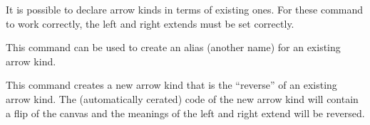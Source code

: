 It is possible to declare arrow kinds in terms of existing ones. For
these command to work correctly, the left and right extends must be
set correctly.

\begin{command}{\pgfarrowsdeclarealias{}}
  This command can be used to create an alias (another name) for an
  existing arrow kind.

\begin{codeexample}[]
%
\end{codeexample}
\end{command}


\begin{command}{\pgfarrowsdeclarereversed{}}
  This command creates a new arrow kind that is the ``reverse'' of an
  existing arrow kind. The (automatically cerated) code of the new
  arrow kind will contain a flip of the canvas and the meanings of the
  left and right extend will be reversed.

\begin{codeexample}[]
%
\end{codeexample}
\end{command}



